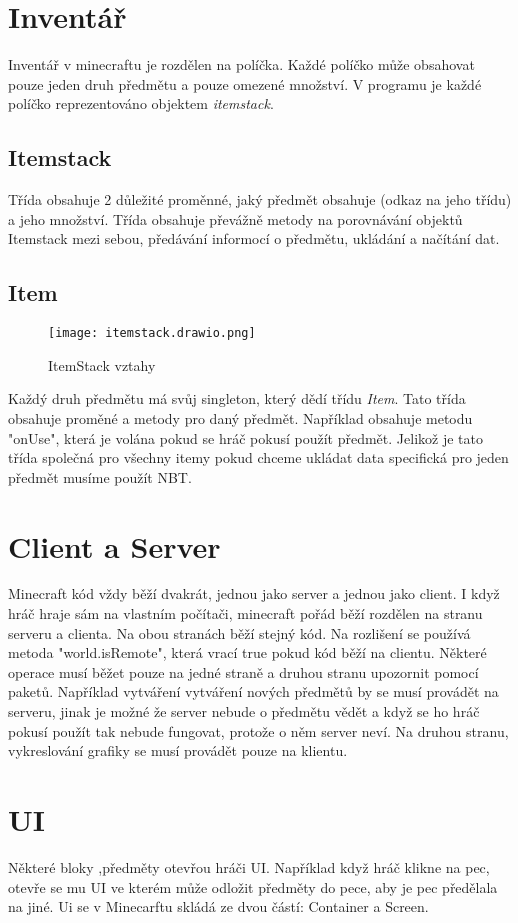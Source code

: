 \documentclass[FM,RP]{tulthesis}
\begin{document}
\section{Inventář}
Inventář v minecraftu je rozdělen na políčka. Každé políčko může obsahovat pouze jeden druh předmětu a pouze omezené množství. V programu je každé políčko reprezentováno objektem \textit{itemstack}. 
\subsection{Itemstack}
Třída obsahuje 2 důležité proměnné, jaký předmět obsahuje (odkaz na jeho třídu) a jeho množství. Třída obsahuje převážně metody na porovnávání objektů Itemstack mezi sebou, předávání informocí o předmětu, ukládání a načítání dat.
\subsection{Item}
\begin{figure}[h]
    \centering
    \texttt{[image: itemstack.drawio.png]}
    \caption{ItemStack vztahy}
    \label{fig:enter-label}
\end{figure}
Každý druh předmětu má svůj singleton, který dědí třídu \textit{Item}. Tato třída obsahuje proměné a metody pro daný předmět. Například obsahuje metodu "onUse", která je volána pokud se hráč pokusí použít předmět. Jelikož je tato třída společná pro všechny itemy pokud chceme ukládat data specifická pro jeden předmět musíme použít NBT.
\section{Client a Server}
Minecraft kód vždy běží dvakrát, jednou jako server a jednou jako client. I když hráč hraje sám na vlastním počítači, minecraft pořád běží rozdělen na stranu serveru a clienta. Na obou stranách běží stejný kód. Na rozlišení se používá metoda "world.isRemote", která vrací true pokud kód běží na clientu. Některé operace musí běžet pouze na jedné straně a druhou stranu upozornit pomocí paketů. Například vytváření vytváření nových předmětů by se musí provádět na serveru, jinak je možné že server nebude o předmětu vědět a když se ho hráč pokusí použít tak nebude fungovat, protože o něm server neví. Na druhou stranu, vykreslování grafiky se musí provádět pouze na klientu. 
\section{UI}
Některé bloky ,předměty otevřou hráči UI. Například když hráč klikne na pec, otevře se mu UI ve kterém může odložit předměty do pece, aby je pec předělala na jiné. Ui se v Minecarftu skládá ze dvou částí: Container a Screen.
\end{document}
